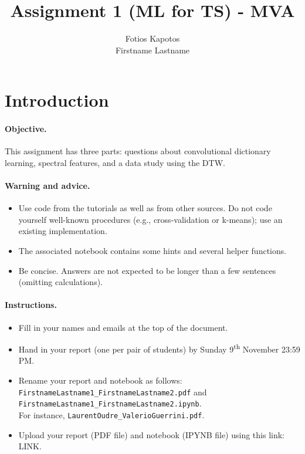 \documentclass[11pt]{article}
\title{Assignment 1 (ML for TS) - MVA}
\author{
Fotios Kapotos \email{fotiskapotos@gmail.com} \\ %
Firstname Lastname \email{youremail2@mail.com} %
}
\begin{document}
\maketitle

\section{Introduction}

\paragraph{Objective.} This assignment has three parts: questions about convolutional dictionary learning, spectral features, and a data study using the DTW. 

\paragraph{Warning and advice.} 
\begin{itemize}
    \item Use code from the tutorials as well as from other sources. Do not code yourself well-known procedures (e.g., cross-validation or k-means); use an existing implementation. 
    \item The associated notebook contains some hints and several helper functions.
    \item Be concise. Answers are not expected to be longer than a few sentences (omitting calculations).
\end{itemize}



\paragraph{Instructions.}
\begin{itemize}
    \item Fill in your names and emails at the top of the document.
    \item Hand in your report (one per pair of students) by Sunday 9\textsuperscript{th} November 23:59 PM.
    \item Rename your report and notebook as follows:\\ \texttt{FirstnameLastname1\_FirstnameLastname2.pdf} and\\ \texttt{FirstnameLastname1\_FirstnameLastname2.ipynb}.\\
    For instance, \texttt{LaurentOudre\_ValerioGuerrini.pdf}.
    \item Upload your report (PDF file) and notebook (IPYNB file) using this link: \footnotesize{LINK}.
\end{itemize}
\end{document}
